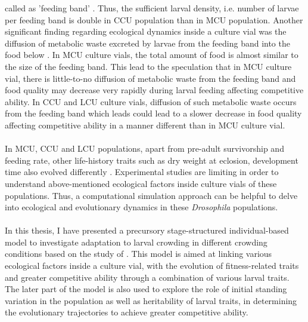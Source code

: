called as 'feeding band' \citep{sarangiEcologicalDetailsMediate2018}. Thus, the sufficient larval density, i.e. number of larvae per feeding band is double in CCU population than in MCU population. Another significant finding regarding ecological dynamics inside a culture vial was the diffusion of metabolic waste excreted by larvae from the feeding band into the food below \citep{sarangiEcologicalDetailsMediate2018}. In MCU culture vials, the total amount of food is almost similar to the size of the feeding band. This lead to the speculation that in MCU culture vial, there is little-to-no diffusion of metabolic waste from the feeding band and food quality may decrease very rapidly during larval feeding affecting competitive ability. In CCU and LCU culture vials, diffusion of such metabolic waste occurs from the feeding band which leads could lead to a slower decrease in food quality affecting competitive ability in a manner different than in MCU culture vial.\\\\
In MCU, CCU and LCU populations, apart from pre-adult survivorship and feeding rate, other life-history traits such as dry weight at eclosion, development time also evolved differently \citep{sarangiEcologicalDetailsMediate2018}. Experimental studies are limiting in order to understand above-mentioned ecological factors inside culture vials of these populations. Thus, a computational simulation approach can be helpful to delve into ecological and evolutionary dynamics in these \textit{Drosophila} populations. \\\\
In this thesis, I have presented a precursory stage-structured individual-based model to investigate adaptation to larval crowding in different crowding conditions based on the study of \citet{sarangiEcologicalDetailsMediate2018}. This model is aimed at linking various ecological factors inside a culture vial, with the evolution of fitness-related traits and greater competitive ability through a combination of various larval traits. The later part of the model is also used to explore the role of initial standing variation in the population as well as heritability of larval traits, in determining the evolutionary trajectories to achieve greater competitive ability. \\\\
\pagebreak
